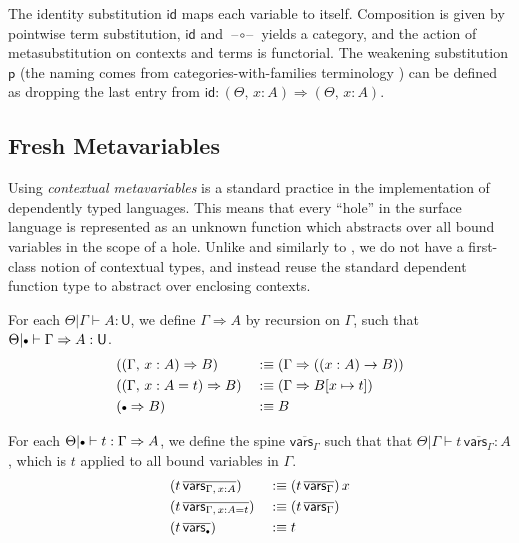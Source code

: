 \documentclass[acmsmall,review,anonymous,prologue,dvipsnames]{acmart}\settopmatter{printfolios=true,printccs=false,printacmref=false}
\renewcommand{\U}{\mathsf{U}}
\newcommand{\emptycon}{\scaleobj{.75}\bullet}
\newcommand{\To}{\Rightarrow}
\newcommand{\p}{\mathsf{p}}
\newcommand{\id}{\mathsf{id}}
\newcommand{\blank}{\mathord{\hspace{1pt}\text{--}\hspace{1pt}}}
\theoremstyle{remark}
\begin{document}
The identity substitution $\id$ maps each variable to itself. Composition is
given by pointwise term substitution, $\id$ and $\blank\circ\blank$ yields a
category, and the action of metasubstitution on contexts and terms is
functorial. The weakening substitution $\p$ (the naming comes from
categories-with-families terminology \cite{dybjer1995internal}) can be defined
as dropping the last entry from $\id : (\Theta,\,x : A) \To (\Theta,\,x : A)$.

\subsection{Fresh Metavariables}

Using \emph{contextual metavariables} is a standard practice in the
implementation of dependently typed languages. This means that every ``hole'' in
the surface language is represented as an unknown function which abstracts over
all bound variables in the scope of a hole. Unlike \cite{nanevski2008contextual}
and similarly to \cite{gundry2013type}, we do not have a first-class notion of
contextual types, and instead reuse the standard dependent function type to
abstract over enclosing contexts.

\begin{definition}\label{def:closingtype} For each $\Theta|\Gamma \vdash A : \U$, we define
$\Gamma \To A$ by recursion on $\Gamma$, such that $\Theta|\emptycon\vdash
  \Gamma \To A : \U$.
  \begin{alignat*}{3}
    &((\Gamma,\, x : A) \To B)     && :\equiv (\Gamma \To ((x : A) \to B))\\
    &((\Gamma,\, x : A = t) \To B) && :\equiv (\Gamma \To B[x\mapsto t])\\
    &(\emptycon \To B)             && :\equiv B
  \end{alignat*}
\end{definition}

\begin{definition}[Contextualization]\label{def:contextualization}
For each $\Theta|\emptycon \vdash t : \Gamma\To A$, we define the spine
$\overline{\mathsf{vars}_{\Gamma}}$ such that that $\Theta|\Gamma\vdash
t\,\overline{\mathsf{vars}_{\Gamma}} : A$, which is $t$ applied to all bound
variables in $\Gamma$.
  \begin{alignat*}{3}
    &(t\,\overline{\mathsf{vars}_{\Gamma,\,x:A}})   && :\equiv (t\,\overline{\mathsf{vars}_{\Gamma}})\,x \\
    &(t\,\overline{\mathsf{vars}_{\Gamma,\,x:A=t}}) && :\equiv (t\,\overline{\mathsf{vars}_{\Gamma}}) \\
    &(t\,\overline{\mathsf{vars}_{\emptycon}})     && :\equiv t
  \end{alignat*}
\end{definition}
\end{document}
